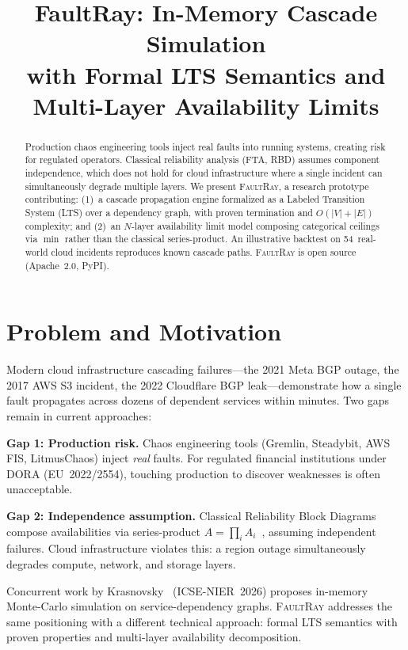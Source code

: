 \documentclass[conference,10pt]{IEEEtran}
\title{FaultRay: In-Memory Cascade Simulation\\with Formal LTS Semantics and\\Multi-Layer Availability Limits}
\author{
  \IEEEauthorblockN{Yutaro Maeda}
  \IEEEauthorblockA{Independent Researcher\\
    Chigasaki, Japan\\
    contact@faultray.com}
}
\begin{document}
\maketitle

\begin{abstract}
Production chaos engineering tools inject real faults into running
systems, creating risk for regulated operators. Classical reliability
analysis (FTA, RBD) assumes component independence, which does not hold
for cloud infrastructure where a single incident can simultaneously
degrade multiple layers. We present \textsc{FaultRay}, a research
prototype contributing: (1)~a cascade propagation engine formalized as
a Labeled Transition System (LTS) over a dependency graph, with proven
termination and $O(|V|{+}|E|)$ complexity; and (2)~an $N$-layer
availability limit model composing categorical ceilings via
$\min$ rather than the classical series-product. An illustrative
backtest on 54~real-world cloud incidents reproduces known cascade
paths. \textsc{FaultRay} is open source (Apache~2.0, PyPI).
\end{abstract}

\section{Problem and Motivation}

Modern cloud infrastructure cascading failures---the 2021 Meta BGP
outage, the 2017 AWS S3 incident, the 2022 Cloudflare BGP
leak---demonstrate how a single fault propagates across dozens of
dependent services within minutes. Two gaps remain in current
approaches:

\textbf{Gap 1: Production risk.} Chaos engineering tools (Gremlin,
Steadybit, AWS FIS, LitmusChaos) inject \emph{real} faults. For
regulated financial institutions under DORA (EU~2022/2554), touching
production to discover weaknesses is often unacceptable.

\textbf{Gap 2: Independence assumption.} Classical Reliability Block
Diagrams compose availabilities via series-product
$A = \prod_i A_i$~\cite{trivedi2001}, assuming independent failures.
Cloud infrastructure violates this: a region outage simultaneously
degrades compute, network, and storage layers.

Concurrent work by Krasnovsky~\cite{krasnovsky2026} (ICSE-NIER~2026)
proposes in-memory Monte-Carlo simulation on service-dependency
graphs. \textsc{FaultRay} addresses the same positioning with a
different technical approach: formal LTS semantics with proven
properties and multi-layer availability decomposition.
\end{document}
